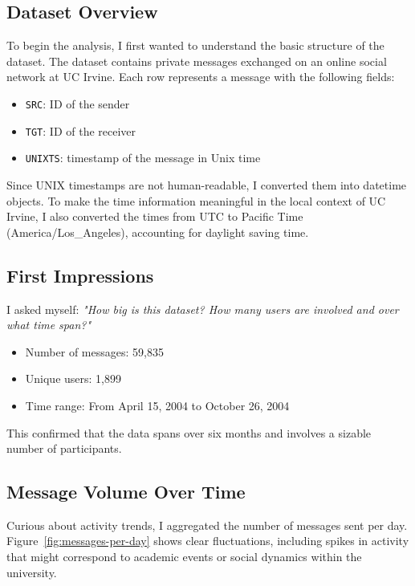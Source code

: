 
\subsection{Dataset Overview}

To begin the analysis, I first wanted to understand the basic structure of the dataset. The dataset contains private messages exchanged on an online social network at UC Irvine. Each row represents a message with the following fields:

\begin{itemize}
    \item \texttt{SRC}: ID of the sender
    \item \texttt{TGT}: ID of the receiver
    \item \texttt{UNIXTS}: timestamp of the message in Unix time
\end{itemize}

Since UNIX timestamps are not human-readable, I converted them into datetime objects. To make the time information meaningful in the local context of UC Irvine, I also converted the times from UTC to Pacific Time (America/Los\_Angeles), accounting for daylight saving time.

\subsection{First Impressions}

I asked myself: \textit{"How big is this dataset? How many users are involved and over what time span?"}

\begin{itemize}
    \item Number of messages: 59,835
    \item Unique users: 1,899
    \item Time range: From April 15, 2004 to October 26, 2004
\end{itemize}

This confirmed that the data spans over six months and involves a sizable number of participants.

\subsection{Message Volume Over Time}

Curious about activity trends, I aggregated the number of messages sent per day. Figure~\ref{fig:messages-per-day} shows clear fluctuations, including spikes in activity that might correspond to academic events or social dynamics within the university.

